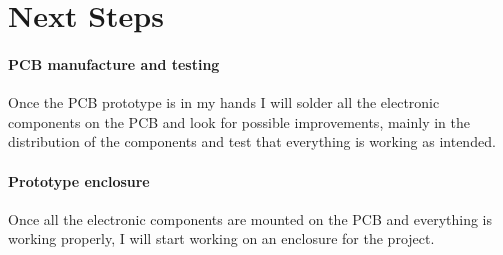 \documentclass{article}
\begin{document}
\section{Next Steps}

\paragraph{PCB manufacture and testing}
Once the PCB prototype is in my hands I will solder all the electronic components on the PCB and look for possible improvements, mainly in the distribution of the components and test that everything is working as intended.

\paragraph{Prototype enclosure}
Once all the electronic components are mounted on the PCB and everything is working properly, I will start working on an enclosure for the project.
\end{document}
